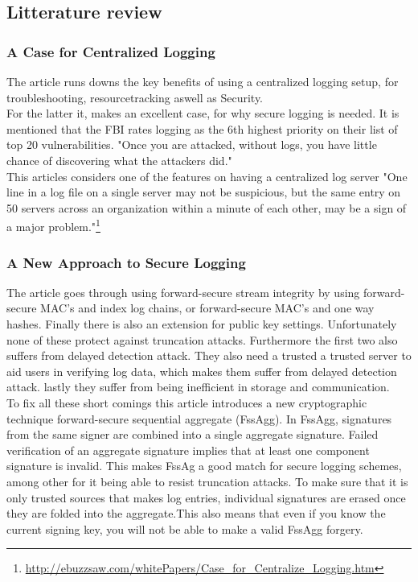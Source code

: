 
\subsection{Litterature review}

\subsubsection{A Case for Centralized Logging }

The article runs downs the key benefits of using a centralized logging setup, for troubleshooting, resourcetracking aswell as Security. \\
For the latter it, makes an excellent case, for why secure logging is needed. It is mentioned that the FBI rates logging as the 6th highest priority on their list of top 20 vulnerabilities. "Once you are attacked, without logs, you have little chance of discovering what the attackers did."\\
This articles considers one of the features on having a centralized log server "One line in a log file on a single server may not be suspicious, but the same entry on 50 servers across an organization within a minute of each other, may be a sign of a major problem."\footnote{\url{http://ebuzzsaw.com/whitePapers/Case_for_Centralize_Logging.htm}}

\subsubsection{A New Approach to Secure Logging}
The article goes through using forward-secure stream integrity by using forward-secure MAC's and index log chains, or forward-secure MAC's and one way hashes. Finally there is also an extension for public key settings. Unfortunately none of these protect against truncation attacks. Furthermore the first two also suffers from delayed detection attack. They also need a trusted a trusted server to aid users in verifying log data, which makes them suffer from delayed detection attack. lastly they suffer from being inefficient in storage and communication.\\
To fix all these short comings this article introduces a new cryptographic technique  forward-secure sequential aggregate (FssAgg). In FssAgg, signatures from the same signer are combined into a single aggregate signature. Failed verification of an aggregate signature implies that at least one component signature is invalid. This makes FssAg a good match for secure logging schemes, among other for it being able to resist truncation attacks. To make sure that it is only trusted sources that makes log entries, individual signatures are erased once they are folded into the aggregate.This also means that even if you know the current signing key, you will not be able to make a valid FssAgg forgery.\\

